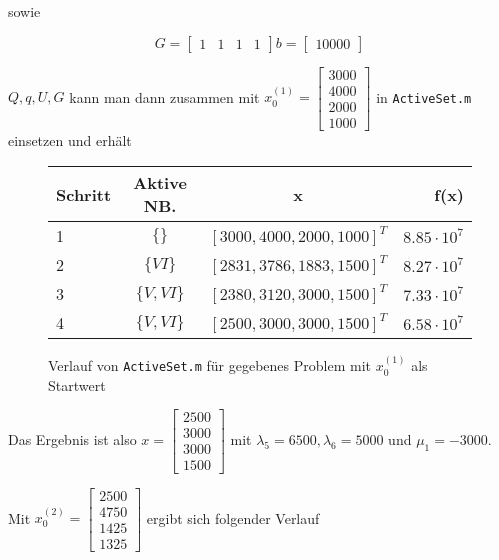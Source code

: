 \documentclass[a4paper, 12pt]{report}
\begin{document}
sowie

$$ G = \begin{bmatrix}1 & 1 & 1 & 1\end{bmatrix} b = \begin{bmatrix}10000\end{bmatrix} $$

$Q, q, U, G$ kann man dann zusammen mit $x_0^{(1)} = \begin{bmatrix}3000\\4000\\2000\\1000\end{bmatrix}$ in \lstinline[basicstyle=\ttfamily\color{black}]|ActiveSet.m| einsetzen und erhält

\begin{figure}[H]
  \centering
  \def\arraystretch{1.25}
  \begin{tabular}{l|c|c|r}
    \hline
    \textbf{Schritt} & \textbf{Aktive NB.} & \textbf{x} & \textbf{f(x)}\\
    \hline
    1 & $\{\}$ & $[3000, 4000, 2000, 1000]^T$ & $8.85 \cdot 10^7$\\
    2 & $\{VI\}$ & $[2831, 3786, 1883, 1500]^T$ & $8.27 \cdot 10^7$\\
    3 & $\{V, VI\}$ & $[2380, 3120, 3000, 1500]^T$ & $7.33 \cdot 10^7$\\
    4 & $\{V, VI\}$ & $[2500, 3000, 3000, 1500]^T$ & $6.58 \cdot 10^7$\\
    \hline
  \end{tabular}
  \caption{Verlauf von \lstinline[basicstyle=\ttfamily\color{black}]|ActiveSet.m| für gegebenes Problem mit $x_0^{(1)}$ als Startwert}
\end{figure}

Das Ergebnis ist also $x = \begin{bmatrix}2500\\3000\\3000\\1500\end{bmatrix}$ mit $\lambda_5 = 6500, \lambda_6 = 5000$ und $\mu_1 = -3000$.

Mit $x_0^{(2)} = \begin{bmatrix}2500\\4750\\1425\\1325\end{bmatrix}$ ergibt sich folgender Verlauf
\end{document}
